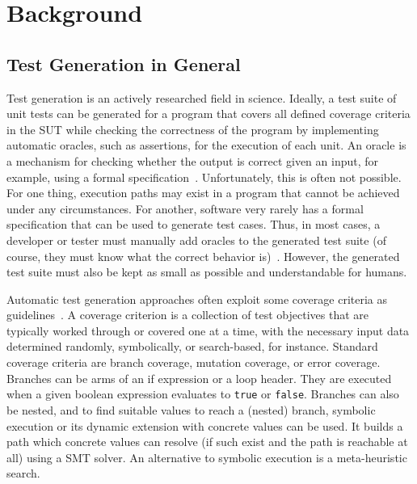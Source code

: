 \documentclass[paper=a4,%
  twoside,%
  BCOR4mm,%
  abstract=true,%
  toc=bibliography,%
  chapterprefix=true,%
  toc=bibliographynumbered,%
  open=right,%
  english,%
  pagesize=pdftex]{scrreprt}
\newcommand{\sut}{\ac{SUT}\xspace}
\begin{document}
\clearpage

\chapter{Background}
\label{chap:backgroud}
\section{Test Generation in General}
Test generation is an actively researched field in science. Ideally, a test suite of unit tests can be generated for a program that covers all defined coverage criteria in the \sut while checking the correctness of the program by implementing automatic oracles, such as assertions, for the execution of each unit. An oracle is a mechanism for checking whether the output is correct given an input, for example, using a formal specification~\cite{McMinn2009}. Unfortunately, this is often not possible. For one thing, execution paths may exist in a program that cannot be achieved under any circumstances. For another, software very rarely has a formal specification that can be used to generate test cases. Thus, in most cases, a developer or tester must manually add oracles to the generated test suite (of course, they must know what the correct behavior is)~\cite{Fraser_2013}. However, the generated test suite must also be kept as small as possible and understandable for humans.

Automatic test generation approaches often exploit some coverage criteria as guidelines~\cite{Fraser_2011a}. A coverage criterion is a collection of test objectives that are typically worked through or covered one at a time, with the necessary input data determined randomly, symbolically, or search-based, for instance. Standard coverage criteria are branch coverage, mutation coverage, or error coverage. Branches can be arms of an if expression or a loop header. They are executed when a given boolean expression evaluates to \texttt{true} or \texttt{false}. Branches can also be nested, and to find suitable values to reach a (nested) branch, symbolic execution or its dynamic extension with concrete values can be used. It builds a path which concrete values can resolve (if such exist and the path is reachable at all) using a \ac{SMT} solver. An alternative to symbolic execution is a meta-heuristic search. 

\end{document}
